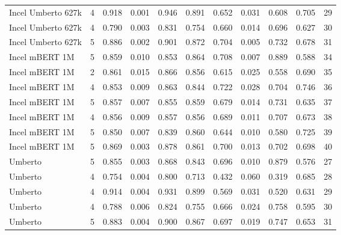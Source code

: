 \begin{tabular}{lrrrrrrrrrr}
Incel Umberto 627k &      4 &   0.918 &          0.001 &    0.946 &     0.891 &    0.652 &           0.031 &     0.608 &      0.705 &  29 \\
Incel Umberto 627k &      4 &   0.790 &          0.003 &    0.831 &     0.754 &    0.660 &           0.014 &     0.696 &      0.627 &  30 \\
Incel Umberto 627k &      5 &   0.886 &          0.002 &    0.901 &     0.872 &    0.704 &           0.005 &     0.732 &      0.678 &  31 \\
    Incel mBERT 1M &      5 &   0.859 &          0.010 &    0.853 &     0.864 &    0.708 &           0.007 &     0.889 &      0.588 &  34 \\
    Incel mBERT 1M &      2 &   0.861 &          0.015 &    0.866 &     0.856 &    0.615 &           0.025 &     0.558 &      0.690 &  35 \\
    Incel mBERT 1M &      4 &   0.853 &          0.009 &    0.863 &     0.844 &    0.722 &           0.028 &     0.704 &      0.746 &  36 \\
    Incel mBERT 1M &      5 &   0.857 &          0.007 &    0.855 &     0.859 &    0.679 &           0.014 &     0.731 &      0.635 &  37 \\
    Incel mBERT 1M &      4 &   0.856 &          0.009 &    0.857 &     0.856 &    0.689 &           0.011 &     0.707 &      0.673 &  38 \\
    Incel mBERT 1M &      5 &   0.850 &          0.007 &    0.839 &     0.860 &    0.644 &           0.010 &     0.580 &      0.725 &  39 \\
    Incel mBERT 1M &      5 &   0.869 &          0.003 &    0.878 &     0.861 &    0.700 &           0.013 &     0.702 &      0.698 &  40 \\
           Umberto &      5 &   0.855 &          0.003 &    0.868 &     0.843 &    0.696 &           0.010 &     0.879 &      0.576 &  27 \\
           Umberto &      4 &   0.754 &          0.004 &    0.800 &     0.713 &    0.432 &           0.060 &     0.319 &      0.685 &  28 \\
           Umberto &      4 &   0.914 &          0.004 &    0.931 &     0.899 &    0.569 &           0.031 &     0.520 &      0.631 &  29 \\
           Umberto &      4 &   0.788 &          0.006 &    0.824 &     0.755 &    0.666 &           0.024 &     0.758 &      0.595 &  30 \\
           Umberto &      5 &   0.883 &          0.004 &    0.900 &     0.867 &    0.697 &           0.019 &     0.747 &      0.653 &  31 \\

\end{tabular}
